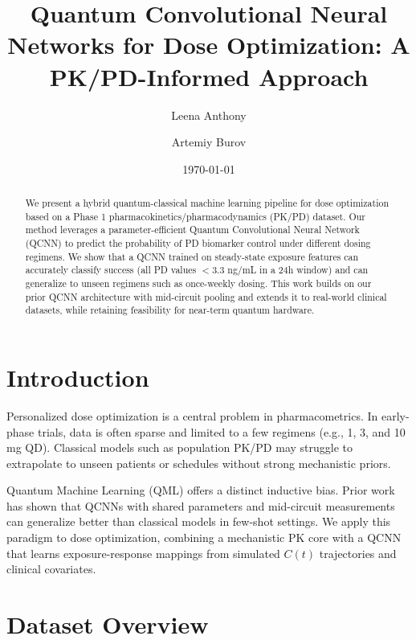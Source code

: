 \documentclass[11pt]{article}
\title{Quantum Convolutional Neural Networks for Dose Optimization: A PK/PD-Informed Approach}
\author[1]{Leena Anthony}
\author[1]{Artemiy Burov}
\affil[1]{FHNW School of Life Sciences, Muttenz, Switzerland}
\date{\today}
\begin{document}
\maketitle

\begin{abstract}
We present a hybrid quantum-classical machine learning pipeline for dose optimization based on a Phase 1 pharmacokinetics/pharmacodynamics (PK/PD) dataset. Our method leverages a parameter-efficient Quantum Convolutional Neural Network (QCNN) to predict the probability of PD biomarker control under different dosing regimens. We show that a QCNN trained on steady-state exposure features can accurately classify success (all PD values $< 3.3$ ng/mL in a 24h window) and can generalize to unseen regimens such as once-weekly dosing. This work builds on our prior QCNN architecture with mid-circuit pooling and extends it to real-world clinical datasets, while retaining feasibility for near-term quantum hardware.
\end{abstract}

\section{Introduction}
Personalized dose optimization is a central problem in pharmacometrics. In early-phase trials, data is often sparse and limited to a few regimens (e.g., 1, 3, and 10 mg QD). Classical models such as population PK/PD may struggle to extrapolate to unseen patients or schedules without strong mechanistic priors. 

Quantum Machine Learning (QML) offers a distinct inductive bias. Prior work \cite{cong2019quantum, caro2022generalization} has shown that QCNNs with shared parameters and mid-circuit measurements can generalize better than classical models in few-shot settings. We apply this paradigm to dose optimization, combining a mechanistic PK core with a QCNN that learns exposure-response mappings from simulated $C(t)$ trajectories and clinical covariates.

\section{Dataset Overview}
\end{document}
